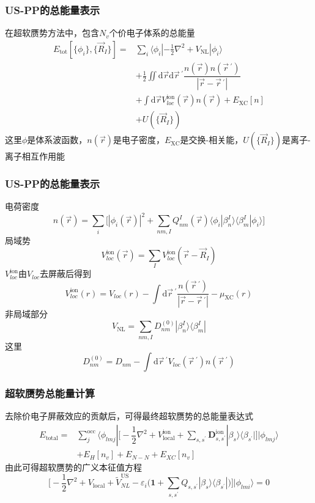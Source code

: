 \frame
{
	\frametitle{\textrm{US-PP}的总能量表示}
	在超软赝势方法中，包含$N_v$个价电子体系的总能量
	\begin{displaymath}
		\begin{aligned}
			E_{\mathrm{tot}}[\{\phi_i\},\{\vec R_I\}]=&\sum_i\langle\phi_i|-\frac12\nabla^2+V_{\mathrm{NL}}|\phi_i\rangle\\
			&+\frac12\iint\mathrm{d}\vec r\mathrm{d}\vec r\,^{\prime}\dfrac{n(\vec r)n(\vec r\,^{\prime})}{|\vec r-\vec r\,^{\prime}|}\\
			&+\int\mathrm{d}\vec r V_{loc}^{\mathrm{ion}}(\vec r)n(\vec r)+E_{\mathrm{XC}}[n]\\
			&+U(\{\vec R_I\})
		\end{aligned}
	\end{displaymath}
	这里$\phi$是体系波函数，$n(\vec r)$是电子密度，$E_{\mathrm{XC}}$是交换-相关能，$U(\{\vec R_I\})$是离子-离子相互作用能
}

\frame
{
	\frametitle{\textrm{US-PP}的总能量表示}
	电荷密度$$n(\vec r)=\sum_i\big[|\phi_i(\vec r)|^2+\sum_{nm,I}Q_{nm}^I(\vec r)\langle\phi_i|\beta_n^I\rangle\langle\beta_m^I|\phi_i\rangle\big]$$
	局域势$$V_{loc}^{\mathrm{ion}}(\vec r)=\sum_IV_{loc}^{\mathrm{ion}}(\vec r-\vec R_I)$$
	$V_{loc}^{\mathrm{ion}}$由$V_{loc}$去屏蔽后得到$$V_{loc}^{\mathrm{ion}}(r)=V_{loc}(r)-\int\mathrm{d}\vec r\,^{\prime}\dfrac{n(\vec r\,^{\prime})}{|\vec r-\vec r\,^{\prime}|}-\mu_{\mathrm{XC}}(r)$$
	非局域部分$$V_{\mathrm{NL}}=\sum_{nm,I}D_{nm}^{(0)}|\beta_n^I\rangle\langle\beta_m^I|$$
	这里$$D_{nm}^{(0)}=D_{nm}-\int\mathrm{d}\vec r\,^{\prime}V_{loc}(\vec r\,^{\prime})n(\vec r\,^{\prime})$$
}

\frame
{
	\frametitle{超软赝势总能量计算}
	去除价电子屏蔽效应的贡献后，可得最终超软赝势的总能量表达式
	\begin{displaymath}
		\begin{aligned}
			E_{\mathrm{total}}=&\sum_j^{\mathrm{occ}}\langle\phi_{lmj}|\bigg[-\dfrac12\nabla^2+V_{\mathrm{local}}^{\mathrm{ion}}+\sum_{s,s^{\prime}}\mathbf{D}_{s,s^{\prime}}^{\mathrm{ion}}|\beta_s\rangle\langle\beta_{s^{\prime}}|\bigg]|\phi_{lmj}\rangle\\
			&+E_{H}[n_v]+E_{N-N}+E_{XC}[n_v]
		\end{aligned}
	\end{displaymath}
	{\fontsize{7.2pt}{5.2pt}}
	由此可得超软赝势的广义本征值方程
	$$\bigg[-\dfrac12\nabla^2+V_{\mathrm{local}}+\tilde V_{NL}^{\mathrm{US}}-\varepsilon_i\bigg(\mathbf{1}+\sum_{s,s^{\prime}}Q_{s,s^{\prime}}|\beta_s\rangle\langle\beta_{s^{\prime}}|\bigg)\bigg]|\phi_{lmi}\rangle=0$$
}

